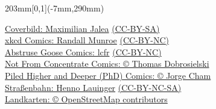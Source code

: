 {    \begin{textblock*}{203mm}[0,1](-7mm,290mm)
        \begin{flushright}
            \footnotesize
	    \href{http://mntl.de}{Coverbild: Maximilian Jalea} \href{http://creativecommons.org/licenses/by-sa/4.0/}{(CC-BY-SA)}\\ %
            \href{http://xkcd.com/}{xkcd Comics: Randall Munroe} \href{http://creativecommons.org/licenses/by-nc/2.5/}{(CC-BY-NC)}\\
            \href{http://abstrusegoose.com/}{Abstruse Goose Comics: lcfr} \href{http://creativecommons.org/licenses/by-nc/3.0/us/}{(CC-BY-NC)}\\
            \href{http://nfccomic.com/index.php}{Not From Concentrate Comics: \copyright{} Thomas Dobrosielski}\\
            \href{http://www.phdcomics.com/}{Piled Higher and Deeper (PhD) Comics: \copyright{} Jorge Cham}\\
            \href{http://mbah.deviantart.com/art/Evil-Tram-126691939}{Straßenbahn: Henno Lauinger} \href{http://creativecommons.org/licenses/by-nc-sa/3.0/}{(CC-BY-NC-SA)}\\
			\href{http://www.openstreetmap.org/}{Landkarten: \copyright{} OpenStreetMap contributors} 
        \end{flushright}
    \end{textblock*}
}

\graphicspath{{./bilder/}{./}}

\newcommand{\dschungel}{
    \marginpar{
        \centering
        \hyperref[dschungel] {
            \texttt{[image: dschungelbuch\_3.pdf]}
        }
    }
}
